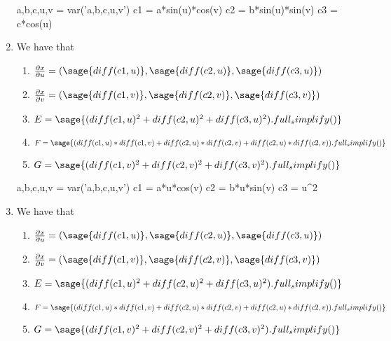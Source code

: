 \documentclass[12pt]{article}
\begin{document}
\begin{enumerate}
    \begin{sagesilent}
        a,b,c,u,v = var('a,b,c,u,v')
        c1 = a*sin(u)*cos(v)
        c2 = b*sin(u)*sin(v)
        c3 = c*cos(u)
    \end{sagesilent}
    \item We have that 
    \begin{enumerate}
    \item $\frac{ \partial x}{\partial u} = (\sage{diff(c1,u)}, \sage{diff(c2, u)}, \sage{diff(c3,u)})$ 
    \item $\frac{ \partial x}{\partial v} = (\sage{diff(c1,v)}, \sage{diff(c2, v)}, \sage{diff(c3,v)})$
    \item $E = \sage{(diff(c1,u)^2 + diff(c2,u)^2 + diff(c3,u)^2).full_simplify()}$
    \item $F = \sage{(diff(c1,u)*diff(c1,v) + diff(c2,u)*diff(c2,v) + diff(c2,u)*diff(c2,v)).full_simplify()}$ 
    \item $G = \sage{(diff(c1,v)^2 + diff(c2,v)^2 + diff(c3,v)^2).full_simplify()}$
    \end{enumerate}

    \begin{sagesilent}
        a,b,c,u,v = var('a,b,c,u,v')
        c1 = a*u*cos(v)
        c2 = b*u*sin(v)
        c3 = u^2
    \end{sagesilent}
    \item We have that 
    \begin{enumerate}
    \item $\frac{ \partial x}{\partial u} = (\sage{diff(c1,u)}, \sage{diff(c2, u)}, \sage{diff(c3,u)})$ 
    \item $\frac{ \partial x}{\partial v} = (\sage{diff(c1,v)}, \sage{diff(c2, v)}, \sage{diff(c3,v)})$
    \item $E = \sage{(diff(c1,u)^2 + diff(c2,u)^2 + diff(c3,u)^2).full_simplify()}$
    \item $F = \sage{(diff(c1,u)*diff(c1,v) + diff(c2,u)*diff(c2,v) + diff(c2,u)*diff(c2,v)).full_simplify()}$ 
    \item $G = \sage{(diff(c1,v)^2 + diff(c2,v)^2 + diff(c3,v)^2).full_simplify()}$
    \end{enumerate}


\end{enumerate}
\end{document}
